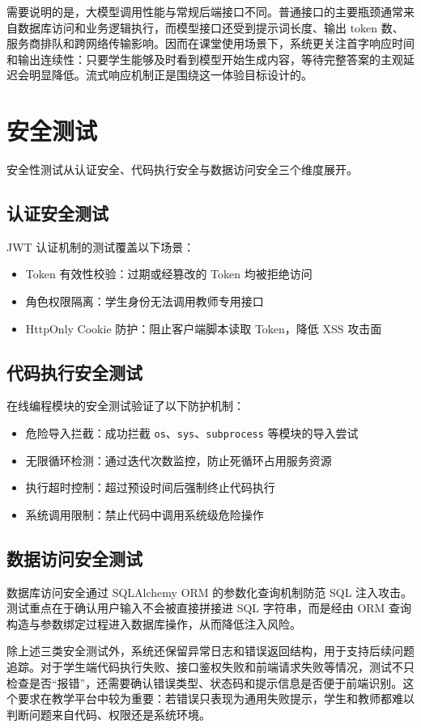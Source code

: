 需要说明的是，大模型调用性能与常规后端接口不同。普通接口的主要瓶颈通常来自数据库访问和业务逻辑执行，而模型接口还受到提示词长度、输出 token 数、服务商排队和跨网络传输影响。因而在课堂使用场景下，系统更关注首字响应时间和输出连续性：只要学生能够及时看到模型开始生成内容，等待完整答案的主观延迟会明显降低。流式响应机制正是围绕这一体验目标设计的。

\section{安全测试}
安全性测试从认证安全、代码执行安全与数据访问安全三个维度展开。

\subsection{认证安全测试}
JWT 认证机制的测试覆盖以下场景：
\begin{itemize}
  \item Token 有效性校验：过期或经篡改的 Token 均被拒绝访问
  \item 角色权限隔离：学生身份无法调用教师专用接口
  \item HttpOnly Cookie 防护：阻止客户端脚本读取 Token，降低 XSS 攻击面
\end{itemize}

\subsection{代码执行安全测试}
在线编程模块的安全测试验证了以下防护机制：
\begin{itemize}
  \item 危险导入拦截：成功拦截 \texttt{os}、\texttt{sys}、\texttt{subprocess} 等模块的导入尝试
  \item 无限循环检测：通过迭代次数监控，防止死循环占用服务资源
  \item 执行超时控制：超过预设时间后强制终止代码执行
  \item 系统调用限制：禁止代码中调用系统级危险操作
\end{itemize}

\subsection{数据访问安全测试}
数据库访问安全通过 SQLAlchemy ORM 的参数化查询机制防范 SQL 注入攻击。测试重点在于确认用户输入不会被直接拼接进 SQL 字符串，而是经由 ORM 查询构造与参数绑定过程进入数据库操作，从而降低注入风险。

除上述三类安全测试外，系统还保留异常日志和错误返回结构，用于支持后续问题追踪。对于学生端代码执行失败、接口鉴权失败和前端请求失败等情况，测试不只检查是否“报错”，还需要确认错误类型、状态码和提示信息是否便于前端识别。这个要求在教学平台中较为重要：若错误只表现为通用失败提示，学生和教师都难以判断问题来自代码、权限还是系统环境。

